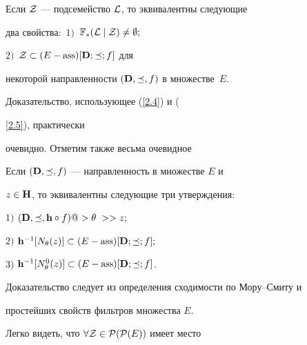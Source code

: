 \begin{props}


Если ${\cal Z}$ --- подсемейство ${\cal L}$, то эквивалентны следующие


два свойства\/${:}$ $1)$~${{\Bbb F}_*}({\cal L}\mid{\cal Z}) \ne \emptyset;$


$2)$~${\cal Z} \subset (E-\operatorname{ass})[{\bold D};\preceq;f]$ для


некоторой направленности $({\bold D},\preceq,f)$ в множестве~$E$.


\end{props}





Доказательство, использующее (\ref{2.4}) и ({\ref{2.5}), практически


очевидно. Отметим также весьма очевидное








\begin{props}


Если $({\bold D},\preceq,f)$ --- направленность в множестве $E$ и


$z \in {\bold H}$, то эквивалентны следующие три утверждения\/${:}$





$1)$ $({\bold D},\preceq,{\bold h}\circ{f}) @>{\theta\;}>> z;$





$2)$ ${{\bold h}^{-1}}[{N_\theta}(z)] \subset


(E-\ass)[{\bold D};\preceq;f];$





$3)$ ${{\bold h}^{-1}}[{N_\theta^0}(z)] \subset


(E-\ass)[{\bold D};\preceq;f]$.


\end{props}





Доказательство следует из определения сходимости по Мору--Смиту и


простейших свойств фильтров множества $E$.





Легко видеть, что $\forall{\cal Z} \in {\cal P}({\cal P}(E))$ имеет место 


\begin{equation}



\end{equation}}
